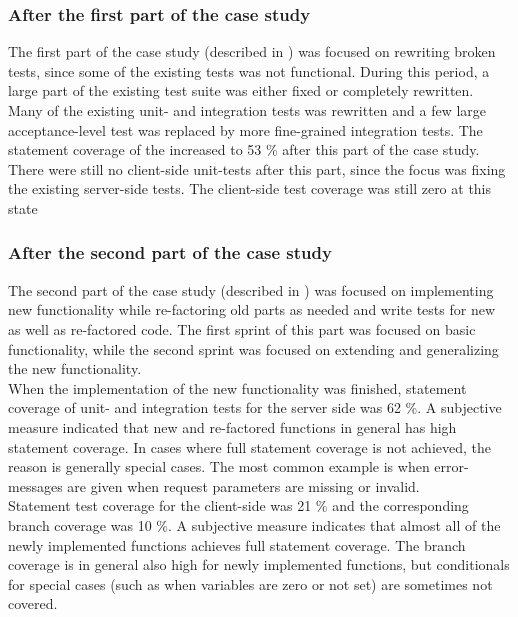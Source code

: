 \subsubsection{After the first part of the case study}

The first part of the case study (described in )
was focused on rewriting broken tests, since some of the existing tests
was not functional. During this period, a large part of the existing
test suite was either fixed or completely rewritten. Many of the
existing unit- and integration tests was rewritten and a few large
acceptance-level test was replaced by more fine-grained integration
tests. The statement coverage of the increased to 53 \% after this
part of the case study.\\

There were still no client-side unit-tests after this part, since the
focus was fixing the existing server-side tests. The client-side test
coverage was still zero at this state \\

\subsubsection{After the second part of the case study}

The second part of the case study (described in )
was focused on implementing new functionality while re-factoring old
parts as needed and write tests for new as well as re-factored code. The
first sprint of this part was focused on basic functionality, while the
second sprint was focused on extending and generalizing the new
functionality.\\

When the implementation of the new functionality was finished, statement
coverage of unit- and integration tests for the server side was 62 \%. A
subjective measure indicated that new and re-factored functions in
general has high statement coverage. In cases where full statement
coverage is not achieved, the reason is generally special cases. The
most common example is when error-messages are given when request
parameters are missing or invalid.\\

Statement test coverage for the client-side was 21 \% and the
corresponding branch coverage was 10 \%. A subjective measure
indicates that almost all of the newly implemented functions achieves
full statement coverage. The branch coverage is in general also high for
newly implemented functions, but conditionals for special cases (such as
when variables are zero or not set) are sometimes not covered.\\
